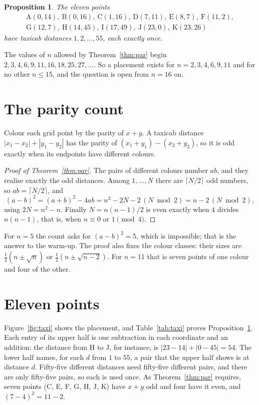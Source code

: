 \documentclass[11pt]{amsart}
\newtheorem{proposition}[theorem]{Proposition}
\theoremstyle{remark}
\begin{document}
\begin{proposition}\label{prop:eleven}
The eleven points
\[
\begin{gathered}
\mathrm{A}(0,14),\ \mathrm{B}(0,16),\ \mathrm{C}(1,16),\ \mathrm{D}(7,11),\ \mathrm{E}(8,7),\ \mathrm{F}(11,2),\\
\mathrm{G}(12,7),\ \mathrm{H}(14,45),\ \mathrm{I}(17,49),\ \mathrm{J}(23,0),\ \mathrm{K}(23,26)
\end{gathered}
\]
have taxicab distances $1,2,\dots,55$, each exactly once.
\end{proposition}

The values of $n$ allowed by Theorem~\ref{thm:par} begin $2,3,4,6,9,11,16,18,25,27,\dots$. So a placement exists for $n=2,3,4,6,9,11$ and for no other $n\le15$, and the question is open from $n=16$ on.

\section{The parity count}

Colour each grid point by the parity of $x+y$. A taxicab distance $|x_1-x_2|+|y_1-y_2|$ has the parity of $(x_1+y_1)-(x_2+y_2)$, so it is odd exactly when its endpoints have different colours.

\begin{proof}[Proof of Theorem~\ref{thm:par}]
The pairs of different colours number $ab$, and they realise exactly the odd distances. Among $1,\dots,N$ there are $\lceil N/2\rceil$ odd numbers, so $ab=\lceil N/2\rceil$, and
\[
(a-b)^2=(a+b)^2-4ab=n^2-2N-2\,(N\bmod 2)=n-2\,(N\bmod 2),
\]
using $2N=n^2-n$. Finally $N=n(n-1)/2$ is even exactly when $4$ divides $n(n-1)$, that is, when $n\equiv0$ or $1\pmod4$.
\end{proof}

For $n=5$ the count asks for $(a-b)^2=5$, which is impossible; that is the answer to the warm-up. The proof also fixes the colour classes: their sizes are $\frac12(n\pm\sqrt n)$ or $\frac12(n\pm\sqrt{n-2})$. For $n=11$ that is seven points of one colour and four of the other.

\section{Eleven points}

Figure~\ref{fig:taxi} shows the placement, and Table~\ref{tab:taxi} proves Proposition~\ref{prop:eleven}. Each entry of its upper half is one subtraction in each coordinate and an addition: the distance from H to J, for instance, is $|23-14|+|0-45|=54$. The lower half names, for each $d$ from $1$ to $55$, a pair that the upper half shows is at distance $d$. Fifty-five different distances need fifty-five different pairs, and there are only fifty-five pairs, so each is used once. As Theorem~\ref{thm:par} requires, seven points (C, E, F, G, H, J, K) have $x+y$ odd and four have it even, and $(7-4)^2=11-2$.
\end{document}
